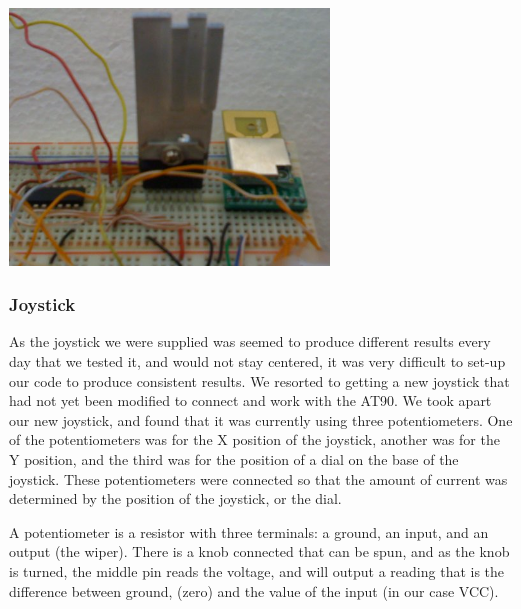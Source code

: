 \begin{center}
  \includegraphics[width=85mm]{imageSources/designProblemsHBridgeHeatsink.png}
\end{center}
\label{HBridgeHeatsink}

\subsubsection{Joystick}
As the joystick we were supplied was seemed to produce different results every day that we tested it, and would not stay centered, it was very difficult to set-up our code to produce consistent results. We resorted to getting a new joystick that had not yet been modified to connect and work with the AT90. We took apart our new joystick, and found that it was currently using three potentiometers. One of the potentiometers was for the X position of the joystick, another was for the Y position, and the third was for the position of a dial on the base of the joystick. These potentiometers were connected so that the amount of current was determined by the position of the joystick, or the dial.

A potentiometer is a resistor with three terminals: a ground, an input, and an output (the wiper). There is a knob connected that can be spun, and as the knob is turned, the middle pin reads the voltage, and will output a reading that is the difference between ground, (zero) and the value of the input (in our case VCC).

